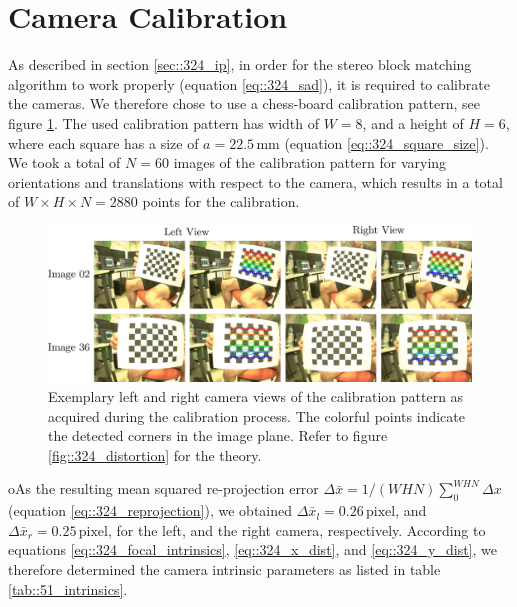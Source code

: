 \section{Camera Calibration}
\label{sec::51_cc}
As described in section \ref{sec::324_ip}, in order for the stereo block matching algorithm to work properly (equation \ref{eq::324_sad}), it is required to calibrate the cameras. We therefore chose to use a chess-board calibration pattern, see figure \ref{fig::51_calib}. The used calibration pattern has width of $W=8$, and a height of $H=6$, where each square has a size of $a=22.5\,\text{mm}$ (equation \ref{eq::324_square_size}). We took a total of $N=60$ images of the calibration pattern for varying orientations and translations with respect to the camera, which results in a total of $W\times H\times N = 2880$ points for the calibration. 
\begin{figure}[h]
	\centering
	\includegraphics[scale=.28]{chapters/05_experiments/01_camera_calibration/calib.png}
	\caption{Exemplary left and right camera views of the calibration pattern as acquired during the calibration process. The colorful points indicate the detected corners in the image plane. Refer to figure \ref{fig::324_distortion} for the theory.}
	\label{fig::51_calib}
\end{figure}
oAs the resulting mean squared re-projection error $\Delta \bar{x} = 1/(WHN)\sum_0^{WHN} \Delta x$ (equation \ref{eq::324_reprojection}), we obtained $\Delta \bar{x}_l = 0.26\, \text{pixel}$, and $\Delta \bar{x}_r = 0.25\,\text{pixel}$, for the left, and the right camera, respectively. According to equations \ref{eq::324_focal_intrinsics}, \ref{eq::324_x_dist}, and \ref{eq::324_y_dist}, we therefore determined the camera intrinsic parameters as listed in table \ref{tab::51_intrinsics}.

